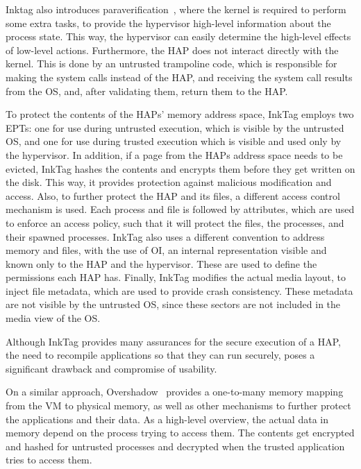 \par Inktag also introduces paraverification~\cite{hofmann2013inktag}, where the kernel is required to perform some extra tasks, to provide the hypervisor high-level information about the process state. This way, the hypervisor can easily determine the high-level effects of low-level actions. Furthermore, the \ac{HAP} does not interact directly with the kernel. This is done by an untrusted trampoline code, which is responsible for making the system calls instead of the \ac{HAP}, and receiving the system call results from the \ac{OS}, and, after validating them, return them to the \ac{HAP}.

\par To protect the contents of the \ac{HAP}s' memory address space, InkTag employs two \ac{EPT}s: one for use during untrusted execution, which is visible by the untrusted \ac{OS}, and one for use during trusted execution which is visible and used only by the hypervisor. In addition, if a page from the \ac{HAP}s address space needs to be evicted, InkTag hashes the contents and encrypts them before they get written on the disk. This way, it provides protection against malicious modification and access.
Also, to further protect the \ac{HAP} and its files, a different access control mechanism is used. Each process and file is followed by attributes, which are used to enforce an access policy, such that it will protect the files, the processes, and their spawned processes. InkTag also uses a different convention to address memory and files, with the use of \ac{OI}, an internal representation visible and known only to the \ac{HAP} and the hypervisor. These are used to define the permissions each \ac{HAP} has.
Finally, InkTag modifies the actual media layout, to inject file metadata, which are used to provide crash consistency. These metadata are not visible by the untrusted \ac{OS}, since these sectors are not included in the media view of the \ac{OS}. 
\par Although InkTag provides many assurances for the secure execution of a \ac{HAP}, the need to recompile applications so that they can run securely, poses a significant drawback and compromise of usability.

\par On a similar approach, Overshadow~\cite{chen2008overshadow} provides a one-to-many memory mapping from the \ac{VM} to physical memory, as well as other mechanisms to further protect the applications and their data. As a high-level overview, the actual data in memory depend on the process trying to access them. The contents get encrypted and hashed for untrusted processes and decrypted when the trusted application tries to access them. 

